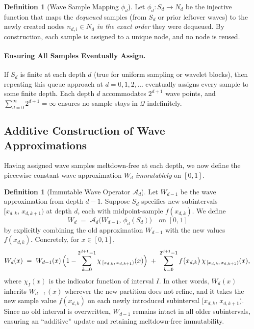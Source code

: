 \documentclass[11pt]{article}
\theoremstyle{definition}
\newtheorem{definition}[theorem]{Definition}
\theoremstyle{remark}
\begin{document}
\begin{definition}[Wave Sample Mapping $\phi_d$]
  \label{def:phi-d}
  Let $\phi_d\colon S_d \to N_d$ be the injective function that maps the
  \emph{dequeued} samples (from $S_d$ or prior leftover waves) to the newly
  created nodes $n_{d,i}\in N_d$ \emph{in the exact order} they were dequeued.
  By construction, each sample is assigned to a unique node, and no node is reused.
\end{definition}

\paragraph{Ensuring All Samples Eventually Assign.}
If $S_d$ is finite at each depth $d$ (true for uniform sampling or wavelet blocks),
then repeating this queue approach at $d=0,1,2,\dots$ eventually assigns every sample
to some finite depth. Each depth $d$ accommodates $2^{d+1}$ wave points, and
$\sum_{d=0}^{\infty} 2^{d+1} = \infty$ ensures no sample stays in $\mathcal{Q}$
indefinitely.

\subsection{Additive Construction of Wave Approximations}
\label{subsec:wave-additive}

Having assigned wave samples meltdown-free at each depth, we now define the piecewise
constant wave approximation $W_d$ \emph{immutablely} on $[0,1]$.

\begin{definition}[Immutable Wave Operator $\mathcal{A}_d$]
  Let $W_{d-1}$ be the wave approximation from depth $d{-}1$. Suppose $S_d$
  specifies new subintervals $[x_{d,k},\,x_{d,k+1})$ at depth $d$, each with
  midpoint-sample $f(x_{d,k})$. We define
  \[
    W_d \;=\; \mathcal{A}_d\bigl(W_{d-1},\,\phi_d(S_d)\bigr)\quad \text{on }[0,1]
  \]
  by explicitly combining the old approximation $W_{d-1}$ with the new values
  $f(x_{d,k})$. Concretely, for $x \in [0,1]$,
  \[
    W_d(x)
    \;=\;
    W_{d-1}(x)\,\Bigl(1 - \sum_{k=0}^{2^{d+1}-1}\chi_{\,[x_{d,k},\,x_{d,k+1})}(x)\Bigr)
    \;+\;
    \sum_{k=0}^{2^{d+1}-1} f\bigl(x_{d,k}\bigr)\,\chi_{\,[x_{d,k},\,x_{d,k+1})}(x),
  \]
  where $\chi_{I}(x)$ is the indicator function of interval $I$. In other words,
  $W_d(x)$ inherits $W_{d-1}(x)$ wherever the new partition does not refine,
  and it takes the new sample value $f(x_{d,k})$ on each newly introduced
  subinterval $[x_{d,k},\,x_{d,k+1})$. Since no old interval is overwritten,
  $W_{d-1}$ remains intact in all older subintervals, ensuring an ``additive''
  update and retaining meltdown-free immutability.
\end{definition}
\end{document}
